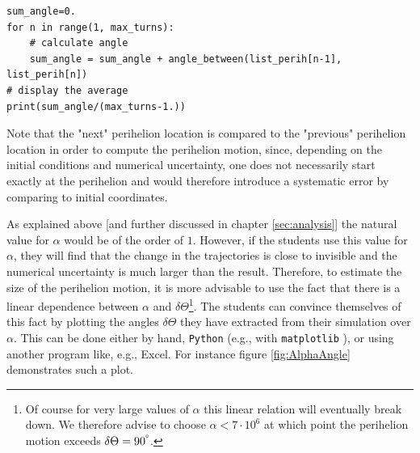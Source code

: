 \documentclass[12pt,ngerman,american]{iopart}
\newcommand{\python}[0]{\texttt{Python}}
\begin{document}
\begin{lstlisting}
sum_angle=0.
for n in range(1, max_turns):
	# calculate angle
	sum_angle = sum_angle + angle_between(list_perih[n-1], list_perih[n])
# display the average
print(sum_angle/(max_turns-1.))
\end{lstlisting}
Note that the "next" perihelion location is compared to the "previous" perihelion location in order to compute the perihelion motion,
since, depending on the initial conditions and numerical uncertainty, one does not necessarily start exactly at the perihelion and
would therefore introduce a systematic error by comparing to initial coordinates.

As explained above [and further discussed in chapter \ref{sec:analysis}] the natural value for $\alpha$ would be of the order of $1$.
However, if the students use this value for $\alpha$, they will find that the change in the trajectories is close to invisible and the numerical uncertainty is much larger than the result.
Therefore, to estimate the size of the perihelion motion, it is more advisable to use the fact that there is a linear dependence between $\alpha$ and $\delta \Theta$\footnote{%
	Of course for very large values of $\alpha$ this linear relation will eventually break down.
	We therefore advise to choose $\alpha<7\cdot 10^6$ at which point the perihelion motion exceeds $\delta \Theta=90^{\degree}$.
}.
The students can convince themselves of this fact by plotting the angles $\delta \Theta$ they have extracted from their simulation over $\alpha$.
This can be done either by hand, \python{} (e.g., with \texttt{matplotlib} \cite{Matplotlib}), or using another program like, e.g., Excel.
For instance figure \ref{fig:AlphaAngle} demonstrates such a plot.
\end{document}
